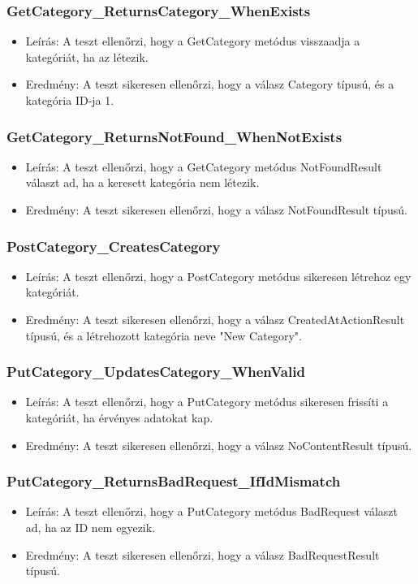 \documentclass[11pt]{article}
\begin{document}
\subsubsection{GetCategory\_ReturnsCategory\_WhenExists}
\label{sec:orgcdf2144}
\begin{itemize}
\item Leírás: A teszt ellenőrzi, hogy a GetCategory metódus visszaadja a kategóriát, ha az létezik.
\item Eredmény: A teszt sikeresen ellenőrzi, hogy a válasz Category típusú, és a kategória ID-ja 1.
\end{itemize}
\subsubsection{GetCategory\_ReturnsNotFound\_WhenNotExists}
\label{sec:org77a37bf}
\begin{itemize}
\item Leírás: A teszt ellenőrzi, hogy a GetCategory metódus NotFoundResult választ ad, ha a keresett kategória nem létezik.
\item Eredmény: A teszt sikeresen ellenőrzi, hogy a válasz NotFoundResult típusú.
\end{itemize}
\subsubsection{PostCategory\_CreatesCategory}
\label{sec:org85a1ec2}
\begin{itemize}
\item Leírás: A teszt ellenőrzi, hogy a PostCategory metódus sikeresen létrehoz egy kategóriát.
\item Eredmény: A teszt sikeresen ellenőrzi, hogy a válasz CreatedAtActionResult típusú, és a létrehozott kategória neve "New Category".
\end{itemize}
\subsubsection{PutCategory\_UpdatesCategory\_WhenValid}
\label{sec:org73a7f74}
\begin{itemize}
\item Leírás: A teszt ellenőrzi, hogy a PutCategory metódus sikeresen frissíti a kategóriát, ha érvényes adatokat kap.
\item Eredmény: A teszt sikeresen ellenőrzi, hogy a válasz NoContentResult típusú.
\end{itemize}
\subsubsection{PutCategory\_ReturnsBadRequest\_IfIdMismatch}
\label{sec:org03808ab}
\begin{itemize}
\item Leírás: A teszt ellenőrzi, hogy a PutCategory metódus BadRequest választ ad, ha az ID nem egyezik.
\item Eredmény: A teszt sikeresen ellenőrzi, hogy a válasz BadRequestResult típusú.
\end{itemize}
\end{document}

